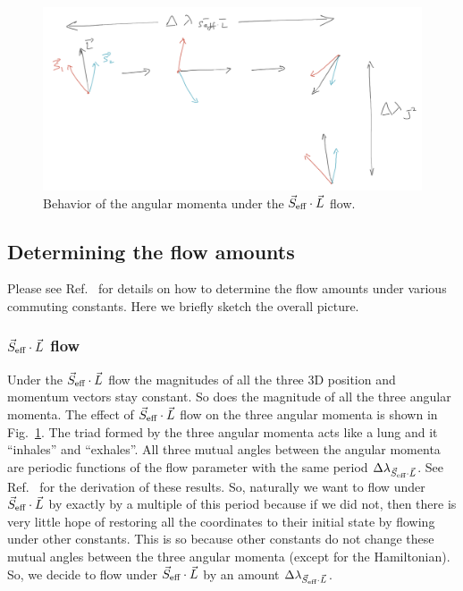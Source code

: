 \begin{figure}
  \centering
  \includegraphics[width=0.8\linewidth]{seffdl_flow}
  \caption{ Behavior of the angular momenta under 
  the $\vec{S}_{\text{eff}}\cdot \vec{L}$ flow.
    \vspace{-1.em}
  }
  \label{seffdl_flow}
\end{figure}


\subsection{Determining the flow amounts}



Please see Ref.~\cite{tanay2021action} for details on how to determine the flow
amounts under various commuting constants. Here we briefly sketch the overall picture.



\subsubsection{$\vec{S}_{\text{eff}}\cdot \vec{L}$ flow}

Under the $\vec{S}_{\text{eff}}\cdot \vec{L}$ flow the magnitudes of all the three 3D position and 
momentum vectors stay constant. So does the magnitude of all the three
angular momenta. The effect of $\vec{S}_{\text{eff}}\cdot \vec{L}$ flow on the three angular momenta 
is shown in Fig.~\ref{seffdl_flow}. The triad formed by the three
angular momenta acts like a lung and it ``inhales'' and ``exhales''.
All three mutual angles between the angular momenta are periodic functions
of the flow parameter with the same period $\Delta \lambda_{\vec{S}_{\text{eff}}\cdot \vec{L}}$.
See Ref.~\cite{tanay2021action}
for the derivation of these results. So, naturally we want to flow 
under $\vec{S}_{\text{eff}}\cdot \vec{L}$ by exactly by a multiple of this period because if we 
did not, then there is very little hope of restoring all the coordinates
to their initial state by flowing under other constants. This
is so because other constants do not change these mutual angles
between the three angular momenta (except for the Hamiltonian).
So, we decide to flow under $\vec{S}_{\text{eff}}\cdot \vec{L}$ by an amount $\Delta \lambda_{\vec{S}_{\text{eff}}\cdot \vec{L}}$.




